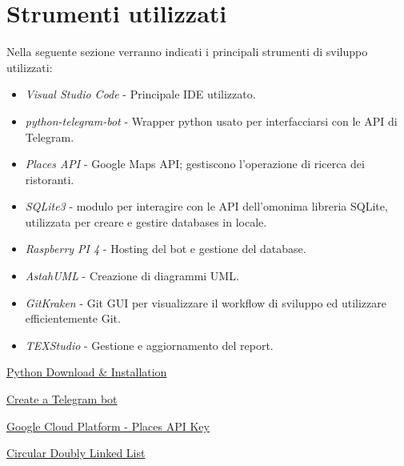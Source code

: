 \documentclass[a4paper, 12pt]{article}
\begin{document}
	\section{Strumenti utilizzati}
	Nella seguente sezione verranno indicati i principali strumenti di sviluppo utilizzati:\\
	\begin{itemize}
		\setlength{\parskip}{0pt}
		\setlength{\parsep}{0pt}
		
		\item \emph{Visual Studio Code} - Principale IDE utilizzato.
		\item \emph{python-telegram-bot} - Wrapper python usato per interfacciarsi con le API di Telegram.
		\item \emph{Places API} - Google Maps API; gestiscono l'operazione di ricerca dei ristoranti.
		\item \emph{SQLite3} - modulo per interagire con le API dell'omonima libreria SQLite, utilizzata per creare e gestire databases in locale.
		\item \emph{Raspberry PI 4} - Hosting del bot e gestione del database.
		\item \emph{AstahUML} - Creazione di diagrammi UML.
		\item \emph{GitKraken} - Git GUI per visualizzare il workflow di sviluppo ed utilizzare efficientemente Git.
		\item \emph{TEXStudio} - Gestione e aggiornamento del report.
	\end{itemize}
	\newpage
	\begin{thebibliography}{99}
		\href{https://www.python.org/downloads/}{Python Download \& Installation}
		
		\href{https://sendpulse.com/knowledge-base/chatbot/create-telegram-chatbot}{Create a Telegram bot}
		
		\href{https://developers.google.com/maps/documentation/places/web-service/get-api-key}{Google Cloud Platform - Places API Key}
		
		\href{https://pythonwife.com/circular-doubly-linked-list-in-python/#:~:text=A%20circular%20doubly%20linked%20list,tail%20node%20and%20vice%20versa.}{Circular Doubly Linked List}
		
	\end{thebibliography} 
\end{document}
